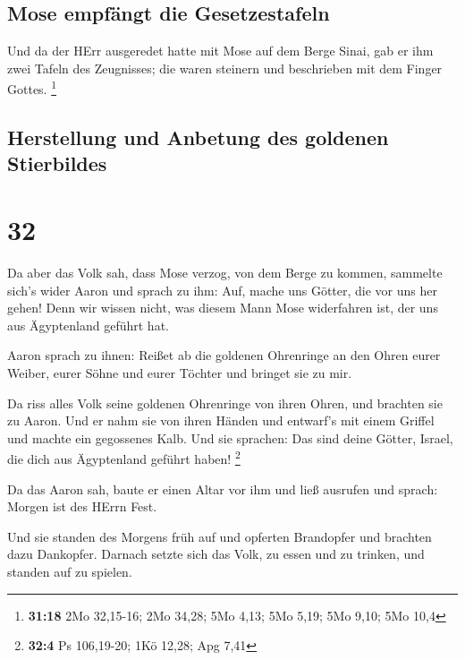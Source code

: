 \hypertarget{mose-empfuxe4ngt-die-gesetzestafeln}{%
\subsection{Mose empfängt die
Gesetzestafeln}\label{mose-empfuxe4ngt-die-gesetzestafeln}}

 Und da der HErr ausgeredet hatte mit Mose auf dem Berge
Sinai, gab er ihm zwei Tafeln des Zeugnisses; die waren steinern und
beschrieben mit dem Finger Gottes. \footnote{\textbf{31:18} 2Mo
  32,15-16; 2Mo 34,28; 5Mo 4,13; 5Mo 5,19; 5Mo 9,10; 5Mo 10,4}

\hypertarget{herstellung-und-anbetung-des-goldenen-stierbildes}{%
\subsection{Herstellung und Anbetung des goldenen
Stierbildes}\label{herstellung-und-anbetung-des-goldenen-stierbildes}}

\hypertarget{section-31}{%
\section{32}\label{section-31}}

 Da aber das Volk sah, dass Mose verzog, von dem Berge zu
kommen, sammelte sich's wider Aaron und sprach zu ihm: Auf, mache uns
Götter, die vor uns her gehen! Denn wir wissen nicht, was diesem Mann
Mose widerfahren ist, der uns aus Ägyptenland geführt hat.

 Aaron sprach zu ihnen: Reißet ab die goldenen Ohrenringe
an den Ohren eurer Weiber, eurer Söhne und eurer Töchter und bringet sie
zu mir.

 Da riss alles Volk seine goldenen Ohrenringe von ihren
Ohren, und brachten sie zu Aaron.  Und er nahm sie von
ihren Händen und entwarf's mit einem Griffel und machte ein gegossenes
Kalb. Und sie sprachen: Das sind deine Götter, Israel, die dich aus
Ägyptenland geführt haben! \footnote{\textbf{32:4} Ps 106,19-20; 1Kö
  12,28; Apg 7,41}

 Da das Aaron sah, baute er einen Altar vor ihm und ließ
ausrufen und sprach: Morgen ist des HErrn Fest.

 Und sie standen des Morgens früh auf und opferten
Brandopfer und brachten dazu Dankopfer. Darnach setzte sich das Volk, zu
essen und zu trinken, und standen auf zu spielen.

